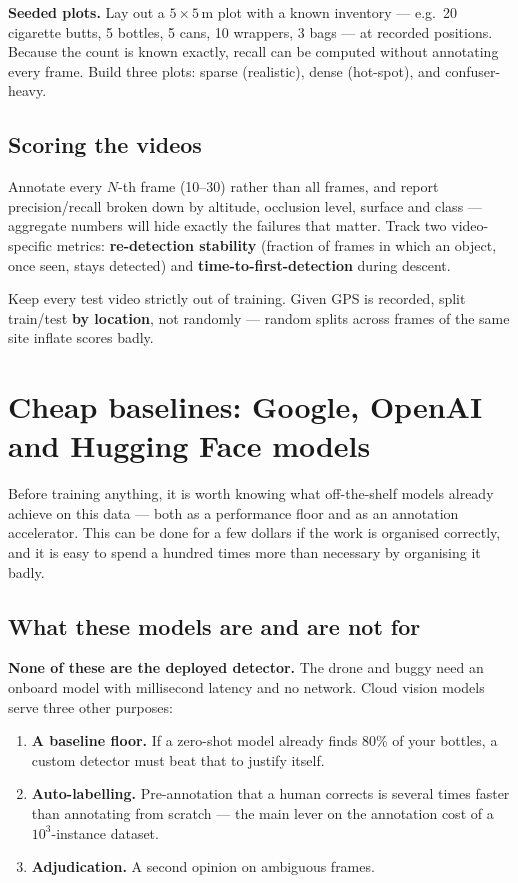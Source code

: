 \documentclass[11pt,a4paper]{article}
\newcommand{\gap}[1]{\textcolor{warn}{\textbf{#1}}}
\begin{document}
\noindent \textbf{Seeded plots.} Lay out a $5\times5$\,m plot with a known
inventory --- e.g.\ 20 cigarette butts, 5 bottles, 5 cans, 10 wrappers, 3 bags
--- at recorded positions. Because the count is known exactly, recall can be
computed without annotating every frame. Build three plots: sparse (realistic),
dense (hot-spot), and confuser-heavy.

\subsection*{Scoring the videos}

Annotate every $N$-th frame (10--30) rather than all frames, and report
precision/recall broken down by altitude, occlusion level, surface and class ---
aggregate numbers will hide exactly the failures that matter. Track two
video-specific metrics: \textbf{re-detection stability} (fraction of frames in
which an object, once seen, stays detected) and \textbf{time-to-first-detection}
during descent.

Keep every test video strictly out of training. Given GPS is recorded, split
train/test \textbf{by location}, not randomly --- random splits across frames of
the same site inflate scores badly.

\section{Cheap baselines: Google, OpenAI and Hugging Face models}
\label{sec:baselines}

Before training anything, it is worth knowing what off-the-shelf models already
achieve on this data --- both as a performance floor and as an annotation
accelerator. This can be done for a few dollars if the work is organised
correctly, and it is easy to spend a hundred times more than necessary by
organising it badly.

\subsection{What these models are and are not for}

\gap{None of these are the deployed detector.} The drone and buggy need an
onboard model with millisecond latency and no network. Cloud vision models serve
three other purposes:

\begin{enumerate}[leftmargin=*,itemsep=1pt]
\item \textbf{A baseline floor.} If a zero-shot model already finds 80\% of your
bottles, a custom detector must beat that to justify itself.
\item \textbf{Auto-labelling.} Pre-annotation that a human corrects is several
times faster than annotating from scratch --- the main lever on the annotation
cost of a $10^3$-instance dataset.
\item \textbf{Adjudication.} A second opinion on ambiguous frames.
\end{enumerate}
\end{document}
